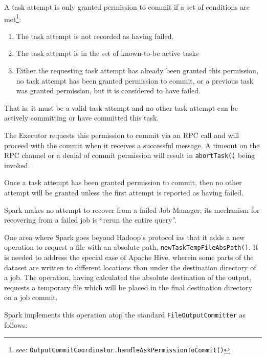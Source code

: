 \documentclass[conference]{IEEEtran}
\newcommand{\TODO}{\emph{TODO}\ }
\begin{document}
A task attempt is only granted permission to commit if a set of conditions
are met\footnote{see: \texttt{OutputCommitCoordinator.handleAskPermissionToCommit()}}:

\begin{enumerate}
  \item The task attempt is not recorded as having failed.
  \item The task attempt is in the set of known-to-be active tasks
  \item Either the requesting task attempt has already been granted this permission,
  no task attempt has been granted permission to commit, or a previous task
  was granted permission, but it is considered to have failed.

\end{enumerate}

That is: it must be a valid task attempt and no other task attempt can be
actively committing or have committed this task.

The Executor requests this permission to commit via an RPC call and will
proceed with the commit when it receives a successful message.
A timeout on the RPC channel or a denial of commit permission will result
in \texttt{abortTask()} being invoked.

Once a task attempt has been granted permission to commit, then no other
attempt will be granted unless the first attempt is reported as having failed.


Spark makes no attempt to recover from a failed Job Manager;
its mechanism for recovering from a failed job is ``rerun the entire query''.

One area where Spark goes beyond Hadoop's protocol ias that
it adds a new operation to request a file with an absolute path,
 \texttt{newTaskTempFileAbsPath()}.
It is needed to address the special case of Apache Hive, wherein
some parts of the dataset are written to different locations than
under the destination directory of a job.
The operation, having calculated the absolute destination of the output,
requests a temporary file which will be placed in the final destination
directory on a job commit.

Spark implements this operation atop the standard \texttt{FileOutputCommitter}
as follows:
\end{document}

